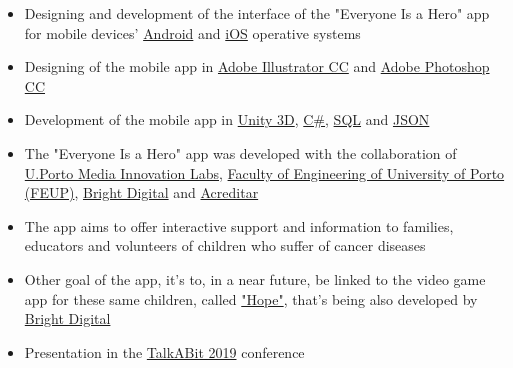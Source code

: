 \documentclass[10pt,a4paper,academicons]{altacv}
\begin{document}
\begin{itemize}
\item Designing and development of the interface of the "Everyone Is a Hero" app for mobile devices' \href{https://www.android.com/}{Android} and \href{https://www.apple.com/ios/ios-12/}{iOS} operative systems
\item Designing of the mobile app in \href{https://www.adobe.com/products/illustrator.html}{Adobe Illustrator CC} and \href{https://www.adobe.com/products/photoshop.html}{Adobe Photoshop CC}
\item Development of the mobile app in \href{https://unity3d.com/}{Unity 3D}, \href{https://en.wikipedia.org/wiki/C_Sharp_(programming_language)}{C\#}, \href{https://en.wikipedia.org/wiki/SQL}{SQL} and \href{https://www.json.org/}{JSON}
\item The "Everyone Is a Hero" app was developed with the collaboration of \href{https://mil.up.pt/}{U.Porto Media Innovation Labs}, \href{https://sigarra.up.pt/feup/pt/web_page.inicial}{Faculty of Engineering of University of Porto (FEUP)}, \href{https://www.bright.pt/}{Bright Digital} and \href{http://www.acreditar.org.pt/}{Acreditar}
\item The app aims to offer interactive support and information to families, educators and volunteers of children who suffer of cancer diseases
\item Other goal of the app, it's to, in a near future, be linked to the video game app for these same children, called \href{https://www.publico.pt/2018/05/22/p3/noticia/o-mundo-e-muito-pequeno-para-hernani-o-investigador-que-quer-descodificar-a-saude-1834877}{"Hope"}, that's being also developed by \href{https://www.bright.pt/}{Bright Digital}
\item Presentation in the \href{http://talkabit.org/}{TalkABit 2019} conference
\end{itemize}
\end{document}
